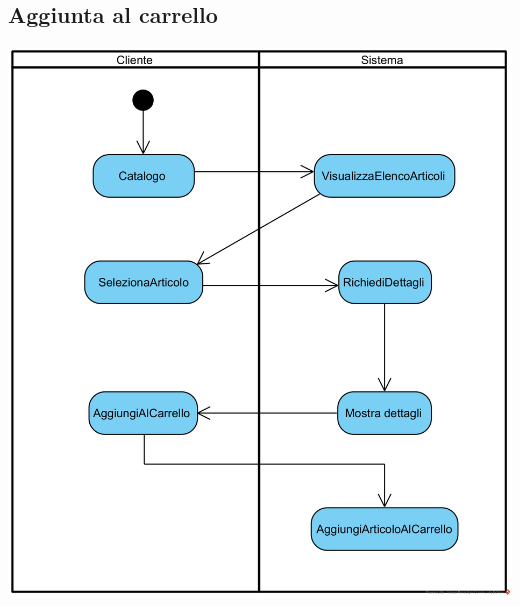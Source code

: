 \documentclass[12pt,a4paper]{article}
\begin{document}
\subsection{Aggiunta al carrello}
\begin{center}
\includegraphics[width=\textwidth]{ActivityDiagram/ClienteAggiungeAlCarrello}
\end{center}
\end{document}
